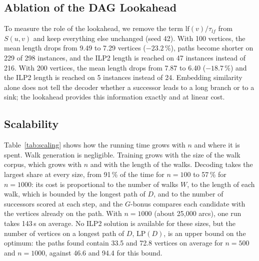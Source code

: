 \documentclass{llncs}
\begin{document}
\subsection{Ablation of the DAG Lookahead}

To measure the role of the lookahead, we remove the term $\mathrm{lf}(v)/\tau_{lf}$ from $S(u,v)$ and keep everything else unchanged (seed 42). With 100 vertices, the mean length drops from 9.49 to 7.29 vertices ($-23.2$\,\%), paths become shorter on 229 of 298 instances, and the ILP2 length is reached on 47 instances instead of 216. With 200 vertices, the mean length drops from 7.87 to 6.40 ($-18.7$\,\%) and the ILP2 length is reached on 5 instances instead of 24. Embedding similarity alone does not tell the decoder whether a successor leads to a long branch or to a sink; the lookahead provides this information exactly and at linear cost.

\subsection{Scalability}
\label{sec:scaling}

Table~\ref{tab:scaling} shows how the running time grows with $n$ and where it is spent. Walk generation is negligible. Training grows with the size of the walk corpus, which grows with $n$ and with the length of the walks. Decoding takes the largest share at every size, from 91\,\% of the time for $n=100$ to 57\,\% for $n=1000$: its cost is proportional to the number of walks $W$, to the length of each walk, which is bounded by the longest path of $D$, and to the number of successors scored at each step, and the $G$-bonus compares each candidate with the vertices already on the path. With $n=1000$ (about 25{,}000 arcs), one run takes 143\,s on average. No ILP2 solution is available for these sizes, but the number of vertices on a longest path of $D$, LP$(D)$, is an upper bound on the optimum: the paths found contain 33.5 and 72.8 vertices on average for $n=500$ and $n=1000$, against 46.6 and 94.4 for this bound.

\begin{table}[t]
\centering
\caption{Running time per phase and path length as $n$ grows (all instances, five seeds). $|A|$ and LP$(D)$ (vertices on a longest path of $D$) are means over instances; Length: mean $\pm$ standard deviation across seeds of the mean; Total: mean $\pm$ standard deviation over runs.}
\label{tab:scaling}

\end{table}
\end{document}
